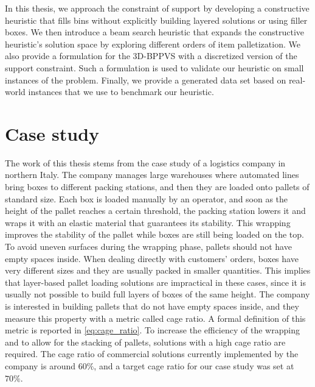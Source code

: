 In this thesis, we approach the constraint of support by developing a constructive heuristic that fills bins without explicitly building layered solutions or using filler boxes.
We then introduce a beam search heuristic that expands the constructive heuristic's solution space by exploring different orders of item palletization.
We also provide a formulation for the 3D-BPPVS with a discretized version of the support constraint. Such a formulation is used to validate our heuristic on small instances of the problem.
Finally, we provide a generated data set based on real-world instances that we use to benchmark our heuristic.

\section{Case study}
\label{sec:intro:case_study}%
The work of this thesis stems from the case study of a logistics company in northern Italy.
The company manages large warehouses where automated lines bring boxes to different packing stations, and then they are loaded onto pallets of standard size.
Each box is loaded manually by an operator, and soon as the height of the pallet reaches a certain threshold, the packing station lowers it and wraps it with an elastic material that guarantees its stability.
This wrapping improves the stability of the pallet while boxes are still being loaded on the top. To avoid uneven surfaces during the wrapping phase, pallets should not have empty spaces inside.
When dealing directly with customers' orders, boxes have very different sizes and they are usually packed in smaller quantities. This implies that layer-based pallet loading solutions are impractical in these cases, since it is usually not possible to build full layers of boxes of the same height.
The company is interested in building pallets that do not have empty spaces inside, and they measure this property with a metric called cage ratio. A formal definition of this metric is reported in \cref{eq:cage_ratio}.
To increase the efficiency of the wrapping and to allow for the stacking of pallets, solutions with a high cage ratio are required.
The cage ratio of commercial solutions currently implemented by the company is around $60\%$, and a target cage ratio for our case study was set at $70\%$.

\newpage
